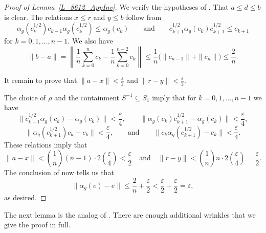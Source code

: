 \documentclass[11pt]{amsart}
\theoremstyle{plain}
\theoremstyle{definition}
\theoremstyle{remark}
\numberwithin{equation}{section}
\newcommand{\rh}{\rho}
\newcommand{\andeqn}{\qquad {\mbox{and}} \qquad}
\begin{document}
\begin{proof}[Proof of Lemma~\ref{L_8612_AppInv}]
We verify the hypotheses of \cite[Lemma 4.3]{AP16}.
That $a \leq d \leq b$ is clear.
The relations $x \leq r$ and $y \leq b$
follow from
\[
\alpha_g ( c_k^{1/2} ) c_{k - 1} \alpha_g ( c_k^{1/2} )
  \leq \alpha_g ( c_k )
\andeqn
c_{k + 1}^{1/2} \alpha_g ( c_k ) c_{k + 1}^{1/2}
 \leq c_{k + 1}
\]
for $k = 0, 1, \ldots, n - 1$.
We also have
\[
\| b - a \|
 = \left\| \frac{1}{n} \sum_{k = 0}^{n} c_k
            - \frac{1}{n} \sum_{k = 0}^{n - 2} c_k \right\|
 \leq \frac{1}{n} \big( \| c_{n - 1} \| + \| c_n \| \big)
 \leq \frac{2}{n}.
\]

It remain to prove that
$\| a - x \| < \frac{\varepsilon}{2}$
and
$\| r - y \| < \frac{\varepsilon}{2}$.

The choice of $\rh$
and the containment $S^{-1} \subseteq S_1$
imply that for $k = 0, 1, \ldots, n - 1$ we have
\[
\big\| c_{k + 1}^{1/2} \alpha_g ( c_k ) - \alpha_g ( c_k ) \big\|
 < \frac{\varepsilon}{4},
\qquad
\big\| \alpha_g ( c_k ) c_{k + 1}^{1/2} - \alpha_g ( c_k ) \big\|
 < \frac{\varepsilon}{4},
\]
\[
\big\| \alpha_g ( c_{k + 1}^{1/2} ) c_{k} - c_{k} \big\|
 < \frac{\varepsilon}{4},
\andeqn
\big\| c_{k} \alpha_g ( c_{k + 1}^{1/2} ) - c_{k} \big\|
 < \frac{\varepsilon}{4}.
\]
These relations imply that
\[
\| a - x \|
 < \left( \frac{1}{n} \right) (n - 1)
       \cdot 2 \left( \frac{\varepsilon}{4} \right)
 < \frac{\varepsilon}{2}
\quad {\mbox{and}} \quad
\| r - y \|
 < \left( \frac{1}{n} \right) n
       \cdot 2 \left( \frac{\varepsilon}{4} \right)
 = \frac{\varepsilon}{2}.
\]
The conclusion of \cite[Lemma 4.3]{AP16}
now tells us that
\[
\| \alpha_g (e) - e \|
 \leq \frac{2}{n} + \frac{\varepsilon}{2}
 < \frac{\varepsilon}{2} + \frac{\varepsilon}{2}
 = \varepsilon,
\]
as desired.
\end{proof}

The next lemma is the analog of
\cite[Lemma 6.6]{HO13}.
There are enough additional wrinkles
that we give the proof in full.
\end{document}
